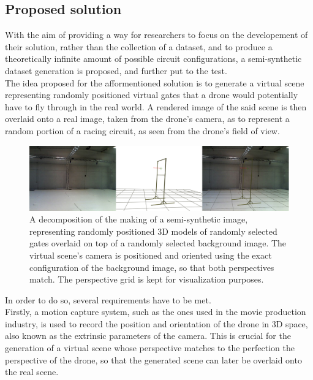 \subsection{Proposed solution}

With the aim of providing a way for researchers to focus on the developement of
their solution, rather than the collection of a dataset, and to produce a
theoretically infinite amount of possible circuit configurations, a
semi-synthetic dataset generation is proposed, and further put to the test.\\

The idea proposed for the afformentioned solution is to generate a virtual
scene representing randomly positioned virtual gates that a drone would
potentially have to fly through in the real world. A rendered image of the said
scene is then overlaid onto a real image, taken from the drone's camera, as to
represent a random portion of a racing circuit, as seen from the drone's field
of view. 

\begin{figure}[h]
	\center
	\includegraphics[width=\textwidth]{figure/dataset_solution.png}
	\caption[The steps of a semi-synthetic image generation.]{A decomposition
	of the making of a semi-synthetic image, representing randomly positioned
	3D models of randomly selected gates overlaid on top of a randomly selected
	background image. The virtual scene's camera is positioned and oriented
	using the exact configuration of the background image, so that both
	perspectives match. The perspective grid is kept for visualization
	purposes.}
\end{figure}

In order to do so, several requirements have to be met.\\

Firstly, a motion capture system, such as the ones used in the movie production
industry, is used to record the position and orientation of the drone in 3D
space, also known as the extrinsic parameters of the camera. This is crucial
for the generation of a virtual scene whose perspective matches to the
perfection the perspective of the drone, so that the generated scene can later
be overlaid onto the real scene.

